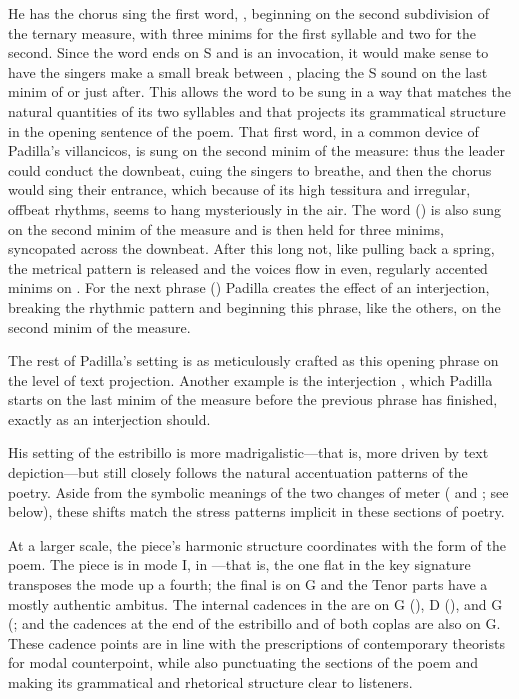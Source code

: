 He has the chorus sing the first word, , beginning
on the second subdivision of the ternary measure, with three minims for the
first syllable and two for the second. 
Since the word ends on S and is an invocation, it would make sense to have the
singers make a small break between , placing the S sound on the
last minim of  or just after.
This allows the word to be sung in a way that matches the natural quantities of
its two syllables and that projects its grammatical structure in the opening
sentence of the poem.
That first word, in a common device of Padilla's villancicos, is sung on the
second minim of the measure: thus the leader could conduct the downbeat, cuing
the singers to breathe, and then the chorus would sing their entrance, which
because of its high tessitura and irregular, offbeat rhythms, seems to hang
mysteriously in the air.
The word  () is also sung on the second minim of the
measure and is then held for three minims, syncopated across the downbeat.
After this long not, like pulling back a spring, the metrical pattern is
released and the voices flow in even, regularly accented minims on .
For the next phrase () Padilla creates the effect
of an interjection, breaking the rhythmic pattern and beginning this phrase,
like the others, on the second minim of the measure.

The rest of Padilla's setting is as meticulously crafted as this opening phrase
on the level of text projection.
Another example is the interjection , which Padilla
starts on the last minim of the measure before the previous phrase has finished,
exactly as an interjection should.

His setting of the estribillo is more madrigalistic---that is, more driven by
text depiction---but still closely follows the natural accentuation patterns of
the poetry.
Aside from the symbolic meanings of the two changes of meter ( and
; see below), these shifts match the stress patterns implicit in
these sections of poetry.

At a larger scale, the piece's harmonic structure coordinates with the form of
the poem.
The piece is in mode I, in ---that is, the one flat in the
key signature transposes the mode up a fourth; the final is on G and the Tenor
parts have a mostly authentic ambitus.
The internal cadences in the  are on G (), D
(), and G (; and the cadences at the end of the
estribillo and of both coplas are also on G. 
These cadence points are in line with the prescriptions of contemporary
theorists for modal counterpoint, while also punctuating the
sections of the poem and making its grammatical and rhetorical structure clear
to listeners.

